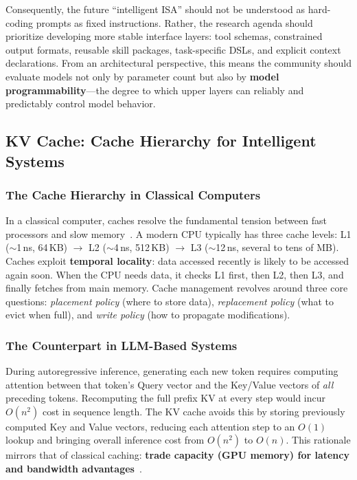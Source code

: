 \documentclass[11pt,a4paper]{article}
\begin{document}
Consequently, the future ``intelligent ISA'' should not be understood as hard-coding prompts as fixed instructions. Rather, the research agenda should prioritize developing more stable interface layers: tool schemas, constrained output formats, reusable skill packages, task-specific DSLs, and explicit context declarations.
From an architectural perspective, this means the community should evaluate models not only by parameter count but also by \textbf{model programmability}---the degree to which upper layers can reliably and predictably control model behavior.

\subsection{KV Cache: Cache Hierarchy for Intelligent Systems}
\label{sec:kv}

\subsubsection{The Cache Hierarchy in Classical Computers}

In a classical computer, caches resolve the fundamental tension between fast processors and slow memory~\cite{drepper2007memory}.
A modern CPU typically has three cache levels: L1 ($\sim$1\,ns, 64\,KB) $\to$ L2 ($\sim$4\,ns, 512\,KB) $\to$ L3 ($\sim$12\,ns, several to tens of MB).
Caches exploit \textbf{temporal locality}: data accessed recently is likely to be accessed again soon.
When the CPU needs data, it checks L1 first, then L2, then L3, and finally fetches from main memory.
Cache management revolves around three core questions: \textit{placement policy} (where to store data), \textit{replacement policy} (what to evict when full), and \textit{write policy} (how to propagate modifications).

\subsubsection{The Counterpart in LLM-Based Systems}

During autoregressive inference, generating each new token requires computing attention between that token's Query vector and the Key/Value vectors of \textit{all} preceding tokens.
Recomputing the full prefix KV at every step would incur $O(n^2)$ cost in sequence length.
The KV cache avoids this by storing previously computed Key and Value vectors, reducing each attention step to an $O(1)$ lookup and bringing overall inference cost from $O(n^2)$ to $O(n)$.
This rationale mirrors that of classical caching: \textbf{trade capacity (GPU memory) for latency and bandwidth advantages}~\cite{drepper2007memory,kwon2023pagedattention}.
\end{document}
